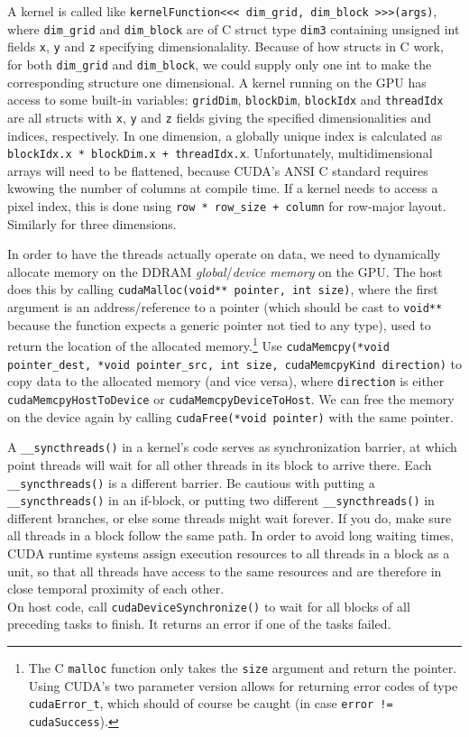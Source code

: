 \documentclass[8pt, table, xcdraw]{article}%
\begin{document}
A kernel is called like \lstinline{kernelFunction<<< dim_grid, dim_block >>>(args)}, where \lstinline{dim_grid} and \lstinline{dim_block} are of C struct type \lstinline{dim3} containing unsigned int fields \lstinline{x}, \lstinline{y} and \lstinline{z} specifying dimensionalality. Because of how structs in C work, for both \lstinline{dim_grid} and \lstinline{dim_block}, we could supply only one int to make the corresponding structure one dimensional. A kernel running on the GPU has access to some built-in variables: \lstinline{gridDim}, \lstinline{blockDim}, \lstinline{blockIdx} and \lstinline{threadIdx} are all structs with \lstinline{x}, \lstinline{y} and \lstinline{z} fields giving the specified dimensionalities and indices, respectively. In one dimension, a globally unique index is calculated as \lstinline{blockIdx.x * blockDim.x + threadIdx.x}. Unfortunately, multidimensional arrays will need to be flattened, because CUDA's ANSI C standard requires kwowing the number of columns at compile time. If a kernel needs to access a pixel index, this is done using \lstinline{row * row_size + column} for row-major layout. Similarly for three dimensions.

In order to have the threads actually operate on data, we need to dynamically allocate memory on the DDRAM \emph{global}/\emph{device memory} on the GPU. The host does this by calling \lstinline{cudaMalloc(void** pointer, int size)}, where the first argument is an address/reference to a pointer (which should be cast to \lstinline{void**} because the function expects a generic pointer not tied to any type), used to return the location of the allocated memory.\footnote{The C \lstinline{malloc} function only takes the \lstinline{size} argument and return the pointer. Using CUDA's two parameter version allows for returning error codes of type \lstinline{cudaError_t}, which should of course be caught (in case \lstinline{error != cudaSuccess}).} Use \lstinline{cudaMemcpy(*void pointer_dest, *void pointer_src, int size, cudaMemcpyKind direction)} to copy data to the allocated memory (and vice versa), where \lstinline{direction} is either \lstinline{cudaMemcpyHostToDevice} or \lstinline{cudaMemcpyDeviceToHost}. We can free the memory on the device again by calling \lstinline{cudaFree(*void pointer)} with the same pointer.

A \lstinline{__syncthreads()} in a kernel's code serves as synchronization barrier, at which point threads will wait for all other threads in its block to arrive there. Each \lstinline{__syncthreads()} is a different barrier. Be cautious with putting a \lstinline{__syncthreads()} in an if-block, or putting two different \lstinline{__syncthreads()} in different branches, or else some threads might wait forever. If you do, make sure all threads in a block follow the same path. In order to avoid long waiting times, CUDA runtime systems assign execution resources to all threads in a block as a unit, so that all threads have access to the same resources and are therefore in close temporal proximity of each other.\\
On host code, call \lstinline{cudaDeviceSynchronize()} to wait for all blocks of all preceding tasks to finish. It returns an error if one of the tasks failed.
\end{document}
